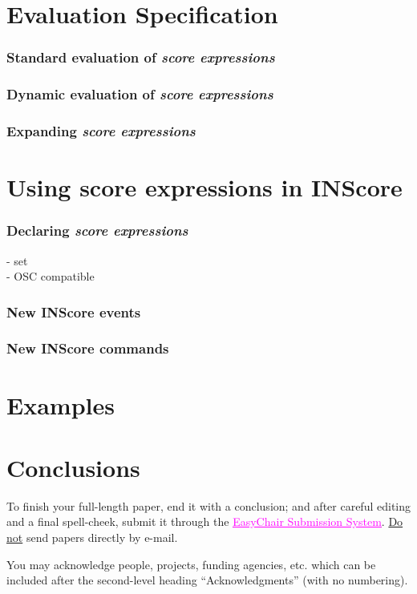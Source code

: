 \documentclass{article}
\newcommand{\sExpr}{\emph{score expressions} }
\begin{document}


\section{Evaluation Specification}
\subsubsection{Standard evaluation of \sExpr}
\subsubsection{Dynamic evaluation of \sExpr}
\subsubsection{Expanding \sExpr}

\section{Using score expressions in INScore}
\subsubsection{Declaring \sExpr}
- set \\
- OSC compatible
\subsubsection{New INScore events}

\subsubsection{New INScore commands}

\section{Examples}

\section{Conclusions}
To finish your full-length paper, end it with a conclusion;
and after careful editing and a final spell-cheek,
submit it through the \href{https://easychair.org/conferences/?conf=tenor2016}{\textcolor {magenta} {\underline {EasyChair Submission System}}}. 
\underline{Do not} send papers directly by e-mail.
%
\begin{acknowledgments}
You may acknowledge people, projects, 
funding agencies, etc. 
which can be included after the second-level heading
``Acknowledgments'' (with no numbering).
\end{acknowledgments} 
\end{document}
